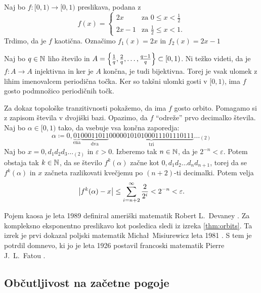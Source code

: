 \begin{zgled}
    Naj bo \(f \colon [0, 1) \to [0, 1)\) preslikava, podana z
    \[
        f (x) =
        \begin{cases}
            2x & \text{za } 0 \leq x < \frac{1}{2}\\
            2x - 1 & \text{za } \frac{1}{2} \leq x < 1.
        \end{cases}
    \]
    Trdimo, da je \(f\) kaotična. Označimo \(f_1 (x) = 2 x\) in \(f_2 (x) = 2x - 1\)

    Naj bo \(q \in \mathbb N\) liho število in \(A = \left\{ \frac{1}{q}, \frac{2}{q}, \dots, \frac{q - 1}{q} \right\} \subset [0, 1)\). Ni težko videti, da je \(f \colon A \to A\) injektivna in ker je \(A\) končna, je tudi bijektivna. Torej je vsak ulomek z lihim imenovalcem periodična točka. Ker so takšni ulomki gosti v \([0, 1)\), ima \(f\) gosto podmnožico periodičnih točk.

    Za dokaz topološke tranzitivnosti pokažemo, da ima \(f\) gosto orbito. Pomagamo si z zapisom števila v dvojiški bazi. Opazimo, da \(f\) ``odreže'' prvo decimalko števila. Naj bo \(\alpha \in [0, 1)\) tako, da vsebuje vsa končna zaporedja:
    \[\alpha \coloneq 0, \underbrace{0 1}_{\text{ena}} \underbrace{00011011}_{\text{dva}} \underbrace{000 001 010 100 011 101 110 111}_{\text{tri}} \dots_{(2)}\]
    Naj bo \(x = 0, d_1 d_2 d_3 \dots_{(2)}\) in \(\varepsilon > 0\). Izberemo tak \(n \in \mathbb N\), da je \(2^{- n} < \varepsilon\). Potem obstaja tak \(k \in \mathbb N\), da se število \(f^k (\alpha)\) začne kot \(0, d_1 d_2 \dots d_n d_{n + 1}\), torej da se \(f^k (\alpha)\) in \(x\) začneta razlikovati kvečjemu po \((n + 2)\)-ti decimalki. Potem velja
    \[\left\lvert f^k (\alpha) - x\right\rvert \leq \sum_{i = n + 2}^{\infty} \frac{2}{2^{i}} < 2^{- n} < \varepsilon.\]
\end{zgled}

\noindent Pojem kaosa je leta \num{1989} definiral ameriški matematik Robert L.~Devaney \cite{Devaney_1986}. Za kompleksno eksponentno preslikavo kot posledica sledi iz izreka  \ref{thm:orbits}. Ta izrek je prvi dokazal poljski matematik Micha\l\ Misiurewicz leta \num{1981} \cite{Misiurewicz_1981}. S tem je potrdil domnevo, ki jo je leta \num{1926} postavil francoski matematik Pierre J.~L.~Fatou \cite{Fatou_1926}.

\subsection{Občutljivost na začetne pogoje}

